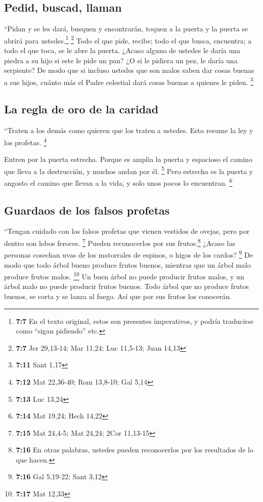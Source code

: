 \hypertarget{pedid-buscad-llaman}{%
\subsection{Pedid, buscad, llaman}\label{pedid-buscad-llaman}}

 ``Pidan y se les dará, busquen y encontrarán, toquen a la
puerta y la puerta se abrirá para ustedes.\footnote{\textbf{7:7} En el
  texto original, estos son presentes imperativos, y podría traducirse
  como ``sigan pidiendo'' etc.} \footnote{\textbf{7:7} Jer 29,13-14; Mar
  11,24; Luc 11,5-13; Juan 14,13}  Todo el que pide,
recibe; todo el que busca, encuentra; a todo el que toca, se le abre la
puerta.  ¿Acaso alguno de ustedes le daría una piedra a su
hijo si este le pide un pan?  ¿O si le pidiera un pez, le
daría una serpiente?  De modo que si incluso ustedes que
son malos saben dar cosas buenas a sus hijos, cuánto más el Padre
celestial dará cosas buenas a quienes le piden. \footnote{\textbf{7:11}
  Sant 1,17}

\hypertarget{la-regla-de-oro-de-la-caridad}{%
\subsection{La regla de oro de la
caridad}\label{la-regla-de-oro-de-la-caridad}}

 ``Traten a los demás como quieren que los traten a
ustedes. Esto resume la ley y los profetas. \footnote{\textbf{7:12} Mat
  22,36-40; Rom 13,8-10; Gal 5,14}

 Entren por la puerta estrecha. Porque es amplia la
puerta y espacioso el camino que lleva a la destrucción, y muchos andan
por él. \footnote{\textbf{7:13} Luc 13,24}  Pero estrecha
es la puerta y angosto el camino que llevan a la vida, y solo unos pocos
lo encuentran. \footnote{\textbf{7:14} Mat 19,24; Hech 14,22}

\hypertarget{guardaos-de-los-falsos-profetas}{%
\subsection{Guardaos de los falsos
profetas}\label{guardaos-de-los-falsos-profetas}}

 ``Tengan cuidado con los falsos profetas que vienen
vestidos de ovejas, pero por dentro son lobos feroces. \footnote{\textbf{7:15}
  Mat 24,4-5; Mat 24,24; 2Cor 11,13-15}  Pueden
reconocerlos por sus frutos.\footnote{\textbf{7:16} En otras palabras,
  ustedes pueden reconocerlos por los resultados de lo que hacen.}
¿Acaso las personas cosechan uvas de los matorrales de espinos, o higos
de los cardos? \footnote{\textbf{7:16} Gal 5,19-22; Sant 3,12}
 De modo que todo árbol bueno produce frutos buenos,
mientras que un árbol malo produce frutos malos. \footnote{\textbf{7:17}
  Mat 12,33}  Un buen árbol no puede producir frutos
malos, y un árbol malo no puede producir frutos buenos. 
Todo árbol que no produce frutos buenos, se corta y se lanza al fuego.
 Así que por sus frutos los conocerán.

